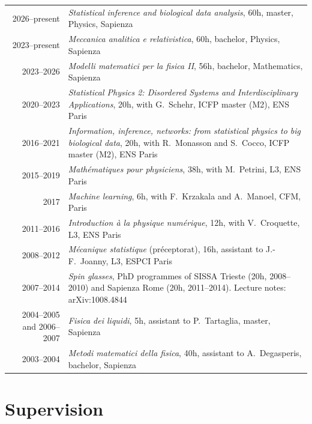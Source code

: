 \documentclass[a4paper,10pt]{article}
\begin{document}
\begin{tabularx}{\textwidth}{@{}D L@{}}
2026--present & \emph{Statistical inference and biological data analysis}, 60h, master, Physics, Sapienza \\
2023--present & \emph{Meccanica analitica e relativistica}, 60h, bachelor, Physics, Sapienza \\
2023--2026 & \emph{Modelli matematici per la fisica II}, 56h, bachelor, Mathematics, Sapienza \\
2020--2023 & \emph{Statistical Physics 2: Disordered Systems and Interdisciplinary Applications}, 20h, with G.~Schehr, ICFP master (M2), ENS Paris \\
2016--2021 & \emph{Information, inference, networks: from statistical physics to big biological data}, 20h, with R.~Monasson and S.~Cocco, ICFP master (M2), ENS Paris \\
2015--2019 & \emph{Mathématiques pour physiciens}, 38h, with M.~Petrini, L3, ENS Paris \\
2017 & \emph{Machine learning}, 6h, with F.~Krzakala and A.~Manoel, CFM, Paris \\
2011--2016 & \emph{Introduction à la physique numérique}, 12h, with V.~Croquette, L3, ENS Paris \\
2008--2012 & \emph{Mécanique statistique} (préceptorat), 16h, assistant to J.-F.~Joanny, L3, ESPCI Paris \\
2007--2014 & \emph{Spin glasses}, PhD programmes of SISSA Trieste (20h, 2008--2010) and Sapienza Rome (20h, 2011--2014). Lecture notes: arXiv:1008.4844 \\
2004--2005 and 2006--2007 & \emph{Fisica dei liquidi}, 5h, assistant to P.~Tartaglia, master, Sapienza \\
2003--2004 & \emph{Metodi matematici della fisica}, 40h, assistant to A.~Degasperis, bachelor, Sapienza \\
\end{tabularx}

\clearpage
\section{Supervision}
\end{document}
